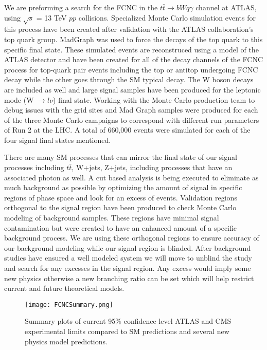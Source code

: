 \documentclass[12pt,letterpaper]{article}
\begin{document}
\par We are preforming a search for the FCNC in the $t\bar{t} \rightarrow bWq\gamma$ channel at ATLAS, using $\sqrt{s}$ = 13 TeV $pp$ collisions.  Specialized Monte Carlo simulation events for this process have been created after validation with the ATLAS collaboration's top quark group.  MadGraph was used to force the decays of the top quark to this specific final state.  These simulated events are reconstruced using a model of the ATLAS detector and have been created for all of the decay channels of the FCNC process for top-quark pair events including the top or antitop undergoing FCNC decay while the other goes through the SM typical decay.  The W boson decays are included as well and large signal samples have been produced for the leptonic mode (W $\rightarrow l \nu$) final state.  Working with the Monte Carlo production team to debug issues with the grid sites and Mad Graph samples were produced for each of the three Monte Carlo campaigns to correspond with different run parameters of Run 2 at the LHC.  A total of 660,000 events were simulated for each of the four signal final states mentioned.

\par There are many SM processes that can mirror the final state of our signal processes including $t\bar{t}$, W+jets, Z+jets, including processes that have an associated photon as well.  A cut based analysis is being executed to eliminate as much background as possible by optimizing the amount of signal in specific regions of phase space and look for an excess of events.  Validation regions orthogonal to the signal region have been produced to check Monte Carlo modeling of background samples.  These regions have minimal signal contamination but were created to have an enhanced amount of a specific background process.  We are using these orthogonal regions to ensure accuracy of our background modeling while our signal region is blinded.  After background studies have ensured a well modeled system we will move to unblind the study and search for any excesses in the signal region.  Any excess would imply some new physics otherwise a new branching ratio can be set which will help restrict current and future theoretical models.

\begin{figure}
\centering
 \texttt{[image: FCNCSummary.png]}
\caption{Summary plots of current 95\% confidence level ATLAS and CMS experimental limits compared to SM predictions and several new physics model predictions. \cite{TopWGPlots}}
\label{fig:FCNCSummary}
\end{figure}
\end{document}
